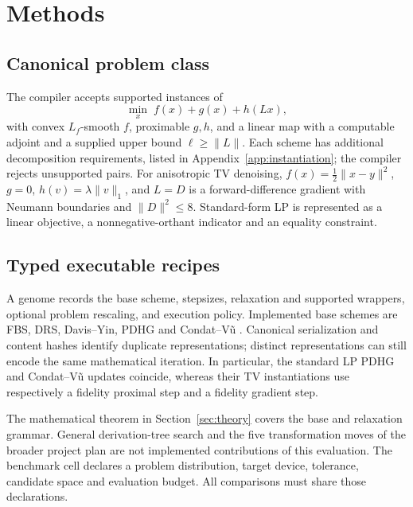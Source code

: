 \section{Methods}
\label{sec:methods}

\subsection{Canonical problem class}

The compiler accepts supported instances of
\begin{equation}
  \min_x\; f(x)+g(x)+h(Lx),
  \label{eq:composite}
\end{equation}
with convex $L_f$-smooth $f$, proximable $g,h$, and a linear map with a
computable adjoint and a supplied upper bound $\ell\geq\|L\|$.
Each scheme has additional decomposition requirements, listed in
Appendix~\ref{app:instantiation}; the compiler rejects unsupported pairs.
For anisotropic TV denoising, $f(x)=\tfrac12\|x-y\|^2$, $g=0$,
$h(v)=\lambda\|v\|_1$, and $L=D$ is a forward-difference gradient with
Neumann boundaries and $\|D\|^2\leq8$. Standard-form LP is represented as
a linear objective, a nonnegative-orthant indicator and an equality constraint.

\subsection{Typed executable recipes}
\label{sec:genome}

A genome records the base scheme, stepsizes, relaxation and supported
wrappers, optional problem rescaling, and execution policy. Implemented base
schemes are FBS, DRS, Davis--Yin, PDHG and Condat--V\~u
\citep{RyuYin2022LargeScale,DavisYin2017Three}. Canonical serialization and
content hashes identify duplicate representations; distinct representations
can still encode the same mathematical iteration. In particular, the standard
LP PDHG and Condat--V\~u updates coincide, whereas their TV instantiations use
respectively a fidelity proximal step and a fidelity gradient step.

The mathematical theorem in Section~\ref{sec:theory} covers the base and
relaxation grammar. General derivation-tree search and the five transformation
moves of the broader project plan are not implemented contributions of this
evaluation. The benchmark cell declares a problem distribution, target device,
tolerance, candidate space and evaluation budget. All comparisons must share
those declarations.

